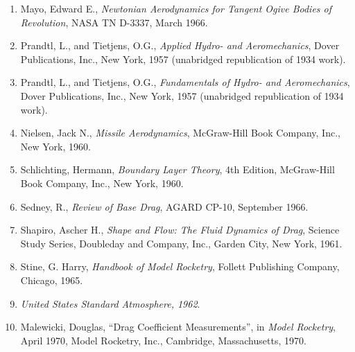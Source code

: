 \begin{enumerate}[label=\arabic*.,ref=\arabic*,leftmargin=*]
  \item\label{ch3:ref:11} Mayo, Edward E., \emph{Newtonian Aerodynamics for Tangent Ogive Bodies of Revolution}, NASA TN D-3337, March 1966.
  \item\label{ch3:ref:12} Prandtl, L., and Tietjens, O.G., \emph{Applied Hydro- and Aeromechanics}, Dover Publications, Inc., New York, 1957 (unabridged republication of 1934 work).
  \item\label{ch3:ref:13} Prandtl, L., and Tietjens, O.G., \emph{Fundamentals of Hydro- and Aeromechanics}, Dover Publications, Inc., New York, 1957 (unabridged republication of 1934 work).
  \item\label{ch3:ref:14} Nielsen, Jack N., \emph{Missile Aerodynamics}, McGraw-Hill Book Company, Inc., New York, 1960.
  \item\label{ch3:ref:15} Schlichting, Hermann, \emph{Boundary Layer Theory}, 4th Edition, McGraw-Hill Book Company, Inc., New York, 1960.
  \item\label{ch3:ref:16} Sedney, R., \emph{Review of Base Drag}, AGARD CP-10, September 1966.
  \item\label{ch3:ref:17} Shapiro, Ascher H., \emph{Shape and Flow: The Fluid Dynamics of Drag}, Science Study Series, Doubleday and Company, Inc., Garden City, New York, 1961.
  \item\label{ch3:ref:18} Stine, G. Harry, \emph{Handbook of Model Rocketry}, Follett Publishing Company, Chicago, 1965.
  \item\label{ch3:ref:19} \emph{United States Standard Atmosphere, 1962}.
  \item\label{ch3:ref:20} Malewicki, Douglas, ``Drag Coefficient Measurements'', in \emph{Model Rocketry}, April 1970, Model Rocketry, Inc., Cambridge, Massachusetts, 1970.
\end{enumerate}
